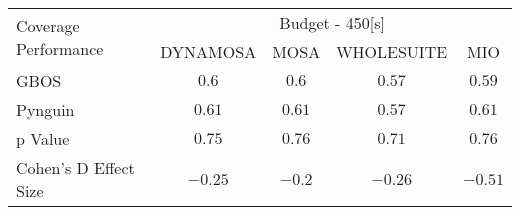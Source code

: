\begin{tabular}{lcccc}\toprule 
\multirow{2}{*}{Coverage Performance} & \multicolumn{4}{c}{Budget - 450[s] } \\ \cmidrule(lr){2-5}  
                                      & DYNAMOSA&MOSA&WHOLESUITE&MIO                         \\ \midrule 
GBOS                                  & \(0.6\)&\(0.6\)&\(0.57\)&\(0.59\)                       \\ 
Pynguin                               & \(0.61\)&\(0.61\)&\(0.57\)&\(0.61\)                       \\ 
p Value                               & \(0.75\)&\(0.76\)&\(0.71\)&\(0.76\)                     \\ 
Cohen's D Effect Size                 & \(-0.25\)&\(-0.2\)&\(-0.26\)&\(-0.51\)                       \\ 
\bottomrule 
\end{tabular}